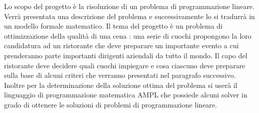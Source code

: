 \documentclass[../modello-progetto.tex]{subfiles}
\begin{document}
Lo scopo del progetto è la risoluzione di un problema di programmazione lineare. Verrà presentata una descrizione del problema e successivamente lo si tradurrà in un modello formale matematico. Il tema del progetto è un problema di ottimizzazione della qualità di una cena : una serie di cuochi propongono la loro candidatura ad un ristorante che deve preparare un importante evento a cui prenderanno parte importanti dirigenti aziendali da tutto il mondo. Il capo del ristorante deve decidere quali cuochi impiegare e cosa ciascuno deve preparare sulla base di alcuni criteri che verranno presentati nel paragrafo successivo.
Inoltre per la determinazione della soluzione ottima del problema si userà il linguaggio di programmazione matematica AMPL che possiede alcuni solver in grado di ottenere le soluzioni di problemi di programmazione lineare.
\end{document}
